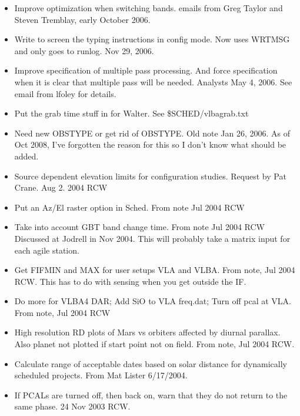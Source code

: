 \documentclass{report}
\begin{document}
\begin{itemize}
\item Improve optimization when switching bands.  emails from Greg Taylor and
      Steven Tremblay, early October 2006.

\item Write to screen the typing instructions in config mode.  Now uses
      WRTMSG and only goes to runlog.  Nov 29, 2006.

\item Improve specification of multiple pass processing.  And force
      specification when it is clear that multiple pass will be needed.
      Analysts  May 4, 2006.  See email from lfoley for details.

\item Put the grab time stuff in for Walter.  See \$SCHED/vlbagrab.txt

\item Need new OBSTYPE or get rid of OBSTYPE.  Old note  Jan 26, 2006.
      As of Oct 2008, I've forgotten the reason for this so I don't
      know what should be added.

\item Source dependent elevation limits for configuration studies.
      Request by Pat Crane.  Aug 2. 2004 RCW

\item Put an Az/El raster option in Sched.  From note Jul 2004 RCW

\item Take into account GBT band change time.  From note Jul 2004 RCW
      Discussed at Jodrell in Nov 2004.  This will probably take a
      matrix input for each agile station.

\item Get FIFMIN and MAX for user setups VLA and VLBA.  From note, Jul
      2004 RCW.  This has to do with sensing when you get outside the
      IF.

\item Do more for VLBA4 DAR;  Add SiO to VLA freq.dat; Turn off pcal
      at VLA.  From note, Jul 2004 RCW

\item High resolution RD plots of Mars vs orbiters affected by
      diurnal parallax.  Also planet not plotted if start point not on
      field.  From note, Jul 2004  RCW.

\item Calculate range of acceptable dates based on solar distance for
      dynamically scheduled projects.  From Mat Lister 6/17/2004.

\item If PCALs are turned off, then back on, warn that they do not
      return to the same phase.  24 Nov 2003 RCW.


\end{itemize}
\end{document}
